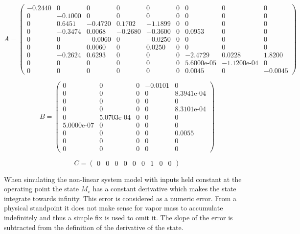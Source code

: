 \begin{equation}  \label{eq:A}
	A = \left(\begin{array}{ccccccccc}
		-0.2440 & 0 & 0 & 0 & 0 & 0 & 0 & 0 & 0\\
		0 & -0.1000 & 0 & 0 & 0 & 0 & 0 & 0 & 0\\
		0 & 0.6451 & -0.4720 & 0.1702 & -1.1899 & 0 & 0 & 0 & 0\\
		0 & -0.3474 & 0.0068 & -0.2680 & -0.3600 & 0 & 0.0953 & 0 & 0\\
		0 & 0 & -0.0060 & 0 & -0.0250 & 0 & 0 & 0 & 0\\
		0 & 0 & 0.0060 & 0 & 0.0250 & 0 & 0 & 0 & 0\\
		0 & -0.2624 & 0.6293 & 0 & 0 & 0 & -2.4729 & 0.0228 & 1.8200\\
		0 & 0 & 0 & 0 & 0 & 0 & \text{5.6000e-05} & -\text{1.1200e-04} & 0\\
		0 & 0 & 0 & 0 & 0 & 0 & 0.0045 & 0 & -0.0045
	\end{array}\right)
\end{equation}

\begin{equation}  \label{eq:B}
	B = \left(\begin{array}{ccccc}
		0 & 0 & 0 & -0.0101 & 0\\
		0 & 0 & 0 & 0 & \text{8.3941e-04}\\
		0 & 0 & 0 & 0 & 0\\
		0 & 0 & 0 & 0 & \text{8.3101e-04}\\
		0 & \text{5.0703e-04} & 0 & 0 & 0\\
		\text{5.0000e-07} & 0 & 0 & 0 & 0\\
		0 & 0 & 0 & 0 & 0.0055\\
		0 & 0 & 0 & 0 & 0\\
		0 & 0 & 0 & 0 & 0
	\end{array}\right)
\end{equation}

\begin{equation}  \label{eq:C}
	C =\left(\begin{array}{ccccccccc}
		0 & 0 & 0 & 0 & 0 & 0 & 1 & 0 & 0
	\end{array}\right)
\end{equation}

When simulating the non-linear system model with inputs held constant at the operating point the state $M_v$ has a constant derivative which makes the state integrate towards infinity. This error is considered as a numeric error. From a physical standpoint it does not make sense for vapor mass to accumulate indefinitely and thus a simple fix is used to omit it. The slope of the error is subtracted from the definition of the derivative of the state.



